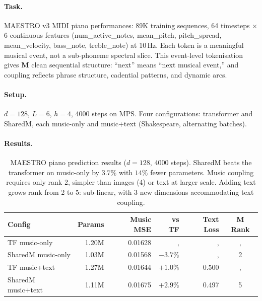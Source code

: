 \documentclass[11pt, a4paper]{article}
\newcommand{\M}{\mathbf{M}}
\theoremstyle{plain}
\theoremstyle{remark}
\begin{document}
\paragraph{Task.}
MAESTRO v3 MIDI piano performances: 89K training sequences, 64 timesteps $\times$ 6 continuous features (num\_active\_notes, mean\_pitch, pitch\_spread, mean\_velocity, bass\_note, treble\_note) at 10\,Hz.
Each token is a meaningful musical event, not a sub-phoneme spectral slice.
This event-level tokenisation gives $\M$ clean sequential structure: ``next'' means ``next musical event,'' and coupling reflects phrase structure, cadential patterns, and dynamic arcs.

\paragraph{Setup.}
$d{=}128$, $L{=}6$, $h{=}4$, 4000 steps on MPS.
Four configurations: transformer and SharedM, each music-only and music+text (Shakespeare, alternating batches).

\paragraph{Results.}

\begin{table}[h]
\centering\small
\begin{tabular}{@{}lrrrrc@{}}
\toprule
\textbf{Config} & \textbf{Params} & \textbf{Music MSE} & \textbf{vs TF} & \textbf{Text Loss} & \textbf{M Rank} \\
\midrule
TF music-only       & 1.20M & 0.01628 & ,      & ,    & ,  \\
SharedM music-only  & 1.03M & 0.01568 & $-3.7\%$ & ,    & 2 \\
TF music+text       & 1.27M & 0.01644 & $+1.0\%$ & 0.500 & ,  \\
SharedM music+text  & 1.11M & 0.01675 & $+2.9\%$ & 0.497 & 5 \\
\bottomrule
\end{tabular}
\caption{MAESTRO piano prediction results ($d{=}128$, 4000 steps).  SharedM beats the transformer on music-only by $3.7\%$ with $14\%$ fewer parameters.  Music coupling requires only rank 2, simpler than images (4) or text at larger scale.  Adding text grows rank from 2 to 5: sub-linear, with 3 new dimensions accommodating text coupling.}
\label{tab:maestro}
\end{table}
\end{document}
